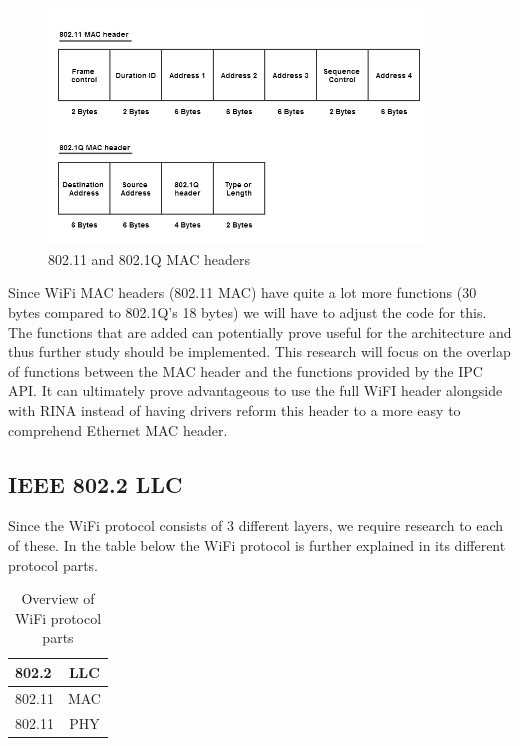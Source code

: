 \begin{figure}[H]
    \centering
    \includegraphics[width=0.9\textwidth]{figures/80211vs8021q}
    \caption{802.11 and 802.1Q MAC headers} 
    \label{fig:80211vs8021q}
\end{figure}

\npar

Since WiFi MAC headers (802.11 MAC) have quite a lot more functions (30 bytes compared to 802.1Q's 18 bytes) we will have to adjust the code for this. The functions that are added can potentially prove useful for the architecture and thus further study should be implemented. This research will focus on the overlap of functions between the MAC header and the functions provided by the IPC API. It can ultimately prove advantageous to use the full WiFI header alongside with RINA instead of having drivers reform this header to a more easy to comprehend Ethernet MAC header. 

\subsection{IEEE 802.2 LLC}

Since the WiFi protocol consists of 3 different layers, we require research to each of these. In the table below the WiFi protocol is further explained in its different protocol parts.

\begin{table}[H]
		\begin{center}
		\begin{tabular}{|lc|}
			\hline
				802.2 & LLC		\\ \hline
				802.11 & MAC		\\ \hline
				802.11 & PHY		\\
			\hline
		\end{tabular}
		\caption{Overview of WiFi protocol parts}
		\end{center}
\end{table}

